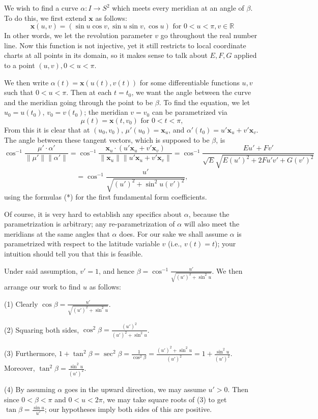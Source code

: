 \documentclass[leqno]{book}
\begin{document}
We wish to find a curve $\alpha:I\to S^2$ which meets every meridian at an angle of $\beta$.  To do this, we first extend $\mathbf x$ as follows:
$$\mathbf x(u,v)=(\sin u\cos v,\sin u\sin v,\cos u)\text{ for }0<u<\pi,v\in\mathbb R$$
In other words, we let the revolution parameter $v$ go throughout the real number line.  Now this function is not injective, yet it still restricts to local coordinate charts at all points in its domain, so it makes sense to talk about $E,F,G$ applied to a point $(u,v),0<u<\pi$.

We then write $\alpha(t)=\mathbf x(u(t),v(t))$ for some differentiable functions $u,v$ such that $0<u<\pi$.  Then at each $t=t_0$, we want the angle between the curve and the meridian going through the point to be $\beta$.  To find the equation, we let $u_0=u(t_0)$, $v_0=v(t_0)$; the meridian $v=v_0$ can be parametrized via
$$\mu(t)=\mathbf x(t,v_0)\text{ for }0<t<\pi,$$
From this it is clear that at $(u_0,v_0)$, $\mu'(u_0)=\mathbf x_u$, and $\alpha'(t_0)=u'\mathbf x_u+v'\mathbf x_v$.  The angle between these tangent vectors, which is supposed to be $\beta$, is
$$\cos^{-1}\frac{\mu'\cdot\alpha'}{\|\mu'\|\|\alpha'\|}=\cos^{-1}\frac{\mathbf x_u\cdot(u'\mathbf x_u+v'\mathbf x_v)}{\|\mathbf x_u\|\|u'\mathbf x_u+v'\mathbf x_v\|}=\cos^{-1}\frac{Eu'+Fv'}{\sqrt E\sqrt{E(u')^2+2Fu'v'+G(v')^2}}$$
$$=\cos^{-1}\frac{u'}{\sqrt{(u')^2+\sin^2u(v')^2}},$$
using the formulas (*) for the first fundamental form coefficients.

Of course, it is very hard to establish any specifics about $\alpha$, because the parametrization is arbitrary; any re-parametrization of $\alpha$ will also meet the meridians at the same angles that $\alpha$ does.  For our sake we shall assume $\alpha$ is parametrized with respect to the latitude variable $v$ (i.e., $v(t)=t$); your intuition should tell you that this is feasible.

Under said assumption, $v'=1$, and hence $\beta=\cos^{-1}\frac{u'}{\sqrt{(u')^2+\sin^2u}}$.  We then arrange our work to find $u$ as follows:

(1) Clearly $\cos\beta=\frac{u'}{\sqrt{(u')^2+\sin^2u}}$.

(2) Squaring both sides, $\cos^2\beta=\frac{(u')^2}{(u')^2+\sin^2u}$.

(3) Furthermore, $1+\tan^2\beta=\sec^2\beta=\frac 1{\cos^2\beta}=\frac{(u')^2+\sin^2u}{(u')^2}=1+\frac{\sin^2u}{(u')^2}$.  Moreover, $\tan^2\beta=\frac{\sin^2u}{(u')^2}$.

(4) By assuming $\alpha$ goes in the upward direction, we may assume $u'>0$.  Then since $0<\beta<\pi$ and $0<u<2\pi$, we may take square roots of (3) to get $\tan\beta=\frac{\sin u}{u'}$; our hypotheses imply both sides of this are positive.
\end{document}

